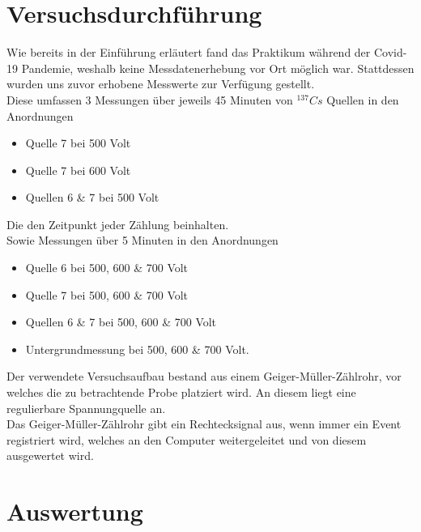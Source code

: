 \documentclass{article}
\begin{document}
	\section{Versuchsdurchführung}
	Wie bereits in der Einführung erläutert fand das Praktikum während der Covid-19 Pandemie, weshalb keine Messdatenerhebung vor Ort möglich war. Stattdessen wurden uns zuvor erhobene Messwerte zur Verfügung gestellt.\\
	Diese umfassen 3 Messungen über jeweils 45 Minuten von $^{137}Cs$ Quellen in den Anordnungen\\
	\begin{itemize}
	\item Quelle 7 bei 500 Volt
	\item Quelle 7 bei 600 Volt
	\item Quellen 6 \& 7 bei 500 Volt\\
	\end{itemize} 
	Die den Zeitpunkt jeder Zählung beinhalten.\\
	Sowie Messungen über 5 Minuten in den Anordnungen\\
	\begin{itemize}
	\item Quelle 6 bei 500, 600 \& 700 Volt
	\item Quelle 7 bei 500, 600 \& 700 Volt
	\item Quellen 6 \& 7 bei 500, 600 \& 700 Volt
	\item Untergrundmessung bei 500, 600 \& 700 Volt.\\
	\end{itemize}
	Der verwendete Versuchsaufbau bestand aus einem Geiger-Müller-Zählrohr, vor welches die zu betrachtende Probe platziert wird. An diesem liegt eine regulierbare Spannungquelle an.\\
	Das Geiger-Müller-Zählrohr gibt ein Rechtecksignal aus, wenn immer ein Event registriert wird, welches an den Computer weitergeleitet und von diesem ausgewertet wird.
	\newpage
	\section{Auswertung}
\end{document}
